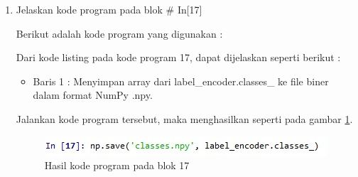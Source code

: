 \begin{enumerate}
\item Jelaskan kode program pada blok \# In[17]
	\par Berikut adalah kode program yang digunakan :
	
	\par Dari kode listing pada kode program 17, dapat dijelaskan seperti berikut :
	\begin{itemize}
	\item Baris 1	: Menyimpan array dari label\_encoder.classes\_ ke file biner dalam format NumPy .npy.
	\end{itemize}
	\par Jalankan kode program tersebut, maka menghasilkan seperti pada gambar \ref{andri17}.
		\begin{figure}[!hbtp]
		\centering
		\includegraphics[scale=0.5]{figures/chapter7/andri17.jpg}
		\caption{Hasil kode program pada blok 17}
		\label{andri17}
		\end{figure}


\end{enumerate}
